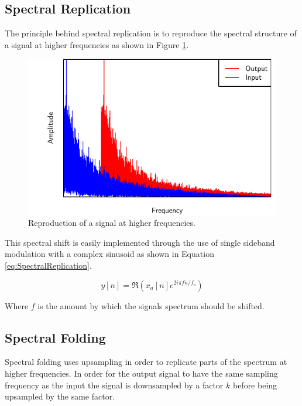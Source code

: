	\subsection{Spectral Replication}
	\label{sec:Excitation-Methods-SpectralReplication}
		The principle behind spectral replication is to reproduce the spectral structure of a signal at higher
		frequencies as shown in Figure \ref{fig:SpectralReplication}.

		\begin{figure}[h!]
			\centering
			\includegraphics{chapter3/Images/SpectralReplicationSpectrum.pdf}
			\caption{Reproduction of a signal at higher frequencies.}
			\label{fig:SpectralReplication}
		\end{figure}

		This spectral shift is easily implemented through the use of single sideband modulation with a complex
		sinusoid as shown in Equation \ref{eq:SpectralReplication}.

		\begin{equation}
			y[n] = \Re \left( x_{a}[n] e^{2i\pi fn/ f_{s}} \right)
			\label{eq:SpectralReplication}
		\end{equation}

		Where $f$ is the amount by which the signals spectrum should be shifted.

	\subsection{Spectral Folding}
	\label{sec:Excitation-Methods-SpectralFolding}
		Spectral folding uses upsampling in order to replicate parts of the spectrum at higher frequencies. In
		order for the output signal to have the same sampling frequency as the input the signal is 
		downsampled by a factor $k$ before being upsampled by the same factor. 
		

